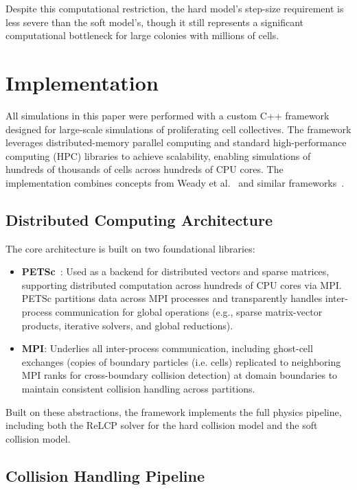 \documentclass[a4paper,fleqn]{cas-dc}
\begin{document}
Despite this computational restriction, the hard model's step-size requirement is less severe than the soft model's, though it still represents a significant computational bottleneck for large colonies with millions of cells.

\section{Implementation}

All simulations in this paper were performed with a custom C++ framework designed for large-scale simulations of proliferating cell collectives. The framework leverages distributed-memory parallel computing and standard high-performance computing (HPC) libraries to achieve scalability, enabling simulations of hundreds of thousands of cells across hundreds of CPU cores. The implementation combines concepts from Weady et al.~\cite{Weady2024SM} and similar frameworks~\cite{Tasora2008,Yan2019}.

\subsection{Distributed Computing Architecture}

The core architecture is built on two foundational libraries:
\begin{itemize}
    \item \textbf{PETSc}~\cite{petsc-web-page}: Used as a backend for distributed vectors and sparse matrices, supporting distributed computation across hundreds of CPU cores via MPI. PETSc partitions data across MPI processes and transparently handles inter-process communication for global operations (e.g., sparse matrix-vector products, iterative solvers, and global reductions).
    \item \textbf{MPI}: Underlies all inter-process communication, including ghost-cell exchanges (copies of boundary particles (i.e. cells) replicated to neighboring MPI ranks for cross-boundary collision detection) at domain boundaries to maintain consistent collision handling across partitions.
\end{itemize}

Built on these abstractions, the framework implements the full physics pipeline, including both the ReLCP solver for the hard collision model and the soft collision model.

\subsection{Collision Handling Pipeline}
\end{document}
